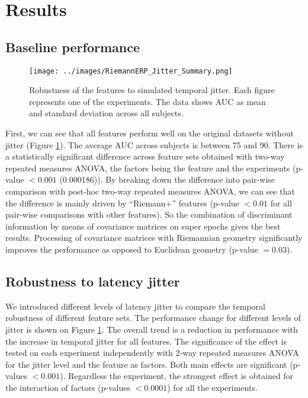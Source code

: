 \documentclass[12pt]{iopart}
\begin{document}
\section{Results}
\label{sec:results}

\subsection{Baseline performance}

\begin{figure}[!t]
    \centering
    \texttt{[image: ../images/RiemannERP\_Jitter\_Summary.png]}
\caption{Robustness of the features to simulated temporal jitter.
    Each figure represents one of the experiments. The data shows
    AUC as mean and standard deviation across all subjects.}
\label{fig:jitter}
\end{figure}

First, we can see that all features perform well on the
original datasets without jitter (Figure \ref{fig:jitter}). The average AUC across subjects is between 75 and 90.
There is a statistically significant difference across feature sets obtained with two-way repeated
measures ANOVA, the factors being the feature and the experiments (p-value $< 0.001$
(0.000186)). By breaking down the difference into pair-wise comparison with post-hoc
two-way repeated measures ANOVA, we can see that the difference is mainly driven by
``Riemann+'' features (p-value $< 0.01$ for all pair-wise comparisons with other
features). So the combination of discriminant information by means
of covariance matrices on super epochs gives the best results. Processing of
covariance matrices with Riemannian geometry significantly improves the performance
as opposed to Euclidean geometry (p-value $= 0.03$).


\subsection{Robustness to latency jitter}

We introduced different levels of latency jitter to compare the temporal robustness
of different feature sets.
The performance change for different levels of jitter is shown on Figure \ref{fig:jitter}.
The overall trend is a reduction in performance with the increase in temporal jitter for all features.
The significance of the effect is tested on each experiment independently
with 2-way repeated measures ANOVA for the jitter level and the feature
as factors. Both main effects are significant (p-values $<0.001$). 
Regardless the experiment, the strongest effect is obtained for the interaction
of factors (p-values $< 0.0001$) for all the experiments.
\end{document}
